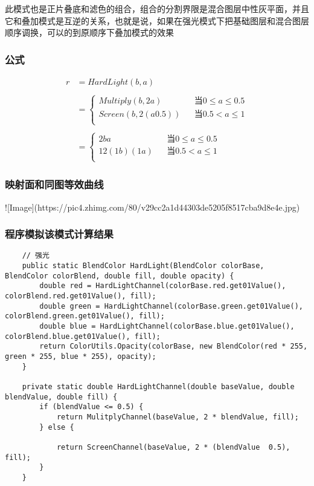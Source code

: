 此模式也是正片叠底和滤色的组合，组合的分割界限是混合图层中性灰平面，并且它和叠加模式是互逆的关系，也就是说，如果在强光模式下把基础图层和混合图层顺序调换，可以的到原顺序下叠加模式的效果

\subsubsection{ 公式}

$$\begin{aligned}r&= HardLight(b,a)\\\\&=\left\{\begin{aligned}Multiply(b,2a)&&当 0\leq a \leq 0.5\\Screen(b,2(a0.5))&&当 0.5< a \leq 1\\\end{aligned}\right.\\\\&=\left\{\begin{aligned}2ba&&当 0\leq a \leq 0.5\\12(1b)(1a)&&当 0.5< a \leq 1\\\end{aligned}\right.\end{aligned}$$

\subsubsection{ 映射面和同图等效曲线}

![Image](https://pic4.zhimg.com/80/v29cc2a1d44303de5205f8517cba9d8e4e.jpg)

\subsubsection{ 程序模拟该模式计算结果}
\begin{lstlisting}
	// 强光
	public static BlendColor HardLight(BlendColor colorBase, BlendColor colorBlend, double fill, double opacity) {
		double red = HardLightChannel(colorBase.red.get01Value(), colorBlend.red.get01Value(), fill);
		double green = HardLightChannel(colorBase.green.get01Value(), colorBlend.green.get01Value(), fill);
		double blue = HardLightChannel(colorBase.blue.get01Value(), colorBlend.blue.get01Value(), fill);
		return ColorUtils.Opacity(colorBase, new BlendColor(red * 255, green * 255, blue * 255), opacity);
	}
	
	private static double HardLightChannel(double baseValue, double blendValue, double fill) {
		if (blendValue <= 0.5) {
			return MulitplyChannel(baseValue, 2 * blendValue, fill);
		} else {
			
			return ScreenChannel(baseValue, 2 * (blendValue  0.5), fill);
		}
	}
\end{lstlisting}



